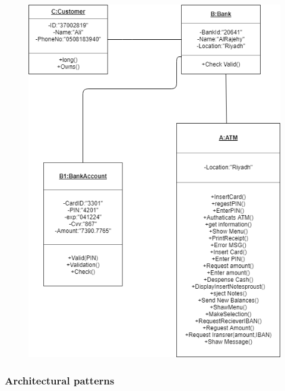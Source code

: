 \documentclass{article}
\begin{document}
		\begin{figure}[h!]
			\begin{center}
				\includegraphics[width=\linewidth]{img/object.png}
			\end{center}
		\end{figure}
	\newpage\subsubsection{Architectural patterns}
\end{document}

